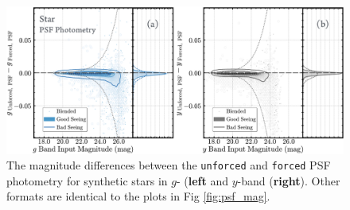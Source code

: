 \documentclass[useamsfonts]{pasj01}
\def\forced{\texttt{forced}}
\def\unforced{\texttt{unforced}}
\begin{document}
\begin{figure}
    \begin{center}
        \includegraphics[width=\textwidth]{fig/synpipe_psf_diff}
    \end{center}
    \caption{
        The magnitude differences between the \unforced{} and \forced{}
        PSF photometry for synthetic stars in $g$- (\textbf{left} and $y$-band
        (\textbf{right}).
        Other formats are identical to the plots in Fig \ref{fig:psf_mag}.
        }
    \label{fig:psf_diff}
\end{figure}
\end{document}
